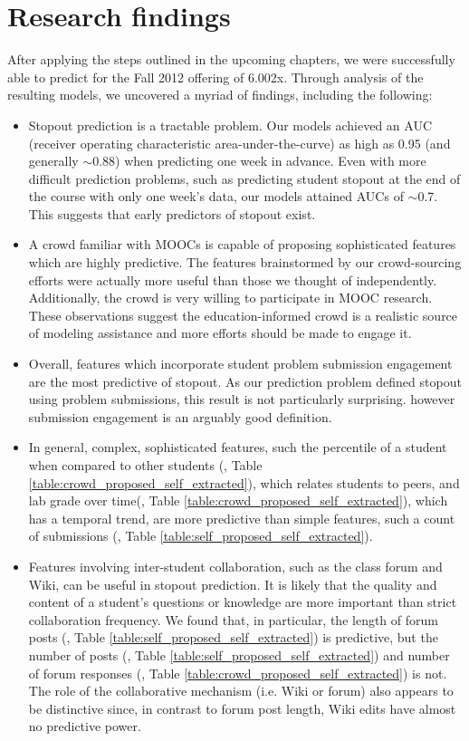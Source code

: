 \section{Research findings}
After applying the steps outlined in the upcoming chapters, we were successfully able to predict \sti for the Fall 2012 offering of 6.002x. Through analysis of the resulting models, we uncovered a myriad of findings, including the following:

\begin{itemize}
\item Stopout prediction is a tractable problem. Our models achieved an AUC (receiver operating characteristic area-under-the-curve) as high as 0.95 (and generally $\sim$0.88) when predicting one week in advance. Even with more difficult prediction problems, such as predicting student stopout at the end of the course with only one week's data, our models attained AUCs of $\sim$0.7. This suggests that early predictors of stopout exist.

\item A crowd familiar with MOOCs is capable of proposing sophisticated features which are highly predictive. The features brainstormed by our crowd-sourcing efforts were actually more useful than those we thought of independently. Additionally, the crowd is very willing to participate in MOOC research. These observations suggest the education-informed crowd is a realistic source of modeling assistance and more efforts should be made to engage it.

\item Overall, features which incorporate student problem submission engagement are the most predictive of stopout. As our prediction problem defined stopout using problem submissions, this result is not particularly surprising. however submission engagement is an arguably good definition.

\item In general, complex, sophisticated features, such the percentile of a student when compared to other students (, Table \ref{table:crowd_proposed_self_extracted}), which relates students to peers, and lab grade over time(, Table \ref{table:crowd_proposed_self_extracted}), which has a temporal trend, are more predictive than simple features, such a count of submissions (, Table \ref{table:self_proposed_self_extracted}). 

\item Features involving inter-student collaboration, such as the class forum and Wiki, can be useful in stopout prediction. It is likely that the quality and content of a student's questions or knowledge are more important than strict collaboration frequency. We found that, in particular, the length of forum posts (, Table \ref{table:self_proposed_self_extracted}) is predictive, but the number of posts (, Table \ref{table:self_proposed_self_extracted}) and number of forum responses (, Table \ref{table:crowd_proposed_self_extracted}) is not. The role of the collaborative mechanism (i.e. Wiki or forum) also appears to be distinctive since, in contrast to forum post length, Wiki edits have almost no predictive power.


\end{itemize}
